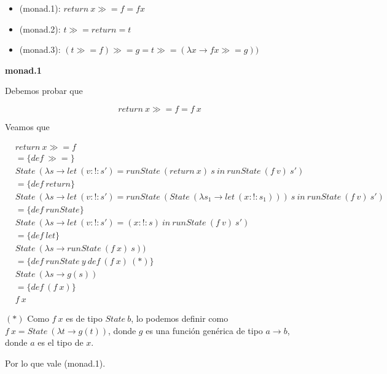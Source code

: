 \documentclass[11pt]{article}
\begin{document}
\begin{itemize}
    \item (monad.1): $return\ x \mathrel{\gg \! \! =} f = f x$
    \item (monad.2): $t \mathrel{\gg \! \! =} return = t$
    \item (monad.3): $(t \mathrel{\gg \! \! =} f) \mathrel{\gg \! \! =} g = t \mathrel{\gg \! \! =} (\lambda x \to f x \mathrel{\gg \! \! =} g))$
\end{itemize} 

\textbf{monad.1}

Debemos probar que 

$$return\ x \mathrel{\gg \! \! =} f = f\ x$$

Veamos que 
\vspace{2mm}

\begin{align*}
    &return\ x \mathrel{\gg \! \! =} f\\
    &= \{def\ \mathrel{\gg \! \! =}\} \\
    &State\ (\lambda s \to let\ (v :\mathrel{!}: s') = runState\ (return\ x)\ s\ in\ runState\ (f\ v)\ s') \\
    &= \{def\ return\} \\ 
    &State\ (\lambda s \to let\ (v :\mathrel{!}: s') = runState\ (State\ (\lambda s_1 \to let\ (x :\mathrel{!}: s_1)))\ s\ in\ runState\ (f\ v)\ s') \\
    &= \{def\ runState\} \\
    &State\ (\lambda s \to let\ (v :\mathrel{!}: s') = (x :\mathrel{!}: s)\ in \ runState\ (f\ v)\ s')\\
    &= \{def\ let\} \\
    &State\ (\lambda s \to runState\ (f\ x)\ s)) \\
    &= \{def\ runState\ y\ def\ (f\ x)\ (*)\} \\
    &State\ (\lambda s \to g(s))\\
    &= \{def\ (f\ x)\}\\
    &f\ x
\end{align*}
\vspace{2mm}

$(*)$ Como $f\ x$ es de tipo $State\ b$, lo podemos definir como $f\ x = State\ (\lambda t \to g(t))$, donde $g$ es una función genérica de tipo $a \to b$, donde $a$ es el tipo de $x$.

\vspace{2mm}

Por lo que vale (monad.1).
\vspace{5cm}
\end{document}
